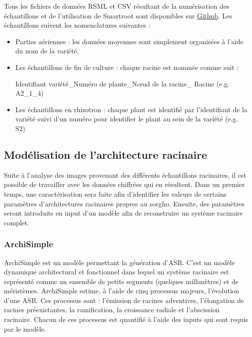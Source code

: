 Tous les fichiers de données RSML et CSV résultant de la numérisation des échantillons et de l'utilisation de Smartroot sont disponibles sur \href{https://github.com/ndegives/Memoire}{Github}.
Les échantillons suivent les nomenclatures suivantes :
\begin{itemize}
    \item Parties aériennes : les données moyennes sont simplement organisées à l'aide du nom de la variété.
    \item Les échantillons de fin de culture : chaque racine est nommée comme suit :
    \begin{center} Identifiant variété\_Numéro de plante\_N\oe ud de la racine\_ Racine (e.g. A2\_1\_4) \end{center}
    \item Les échantillons en rhizotron : chaque plant est identifié par l'identifiant de la variété suivi d'un numéro pour identifier le plant au sein de la variété (e.g. S2)
\end{itemize}

\subsection{Modélisation de l'architecture racinaire}

Suite à l'analyse des images provenant des différents échantillons racinaires, il est possible de travailler avec les données chiffrées qui en résultent.
Dans un premier temps, une caractérisation sera faite afin d'identifier les valeurs de certains paramètres d'architectures racinaires propres au sorgho.
Ensuite, des paramètres seront introduits en input d'un modèle afin de reconstruire un système racinaire complet.

\subsubsection{ArchiSimple}

ArchiSimple  \citep{pages_calibration_2014} est un modèle permettant la génération d'ASR.
C'est un modèle dynamique architectural et fonctionnel dans lequel un système racinaire est représenté comme un ensemble de petits segments (quelques millimètres) et de méristèmes.
ArchiSimple estime, à l'aide de cinq processus majeurs, l'évolution d'une ASR.
Ces processus sont : l'émission de racines adventives, l'élongation de racines préexistantes, la ramification, la croissance radiale et l'abscission racinaire.
Chacun de ces processus est quantifié à l'aide des inputs qui sont requis par le modèle.
\newline

